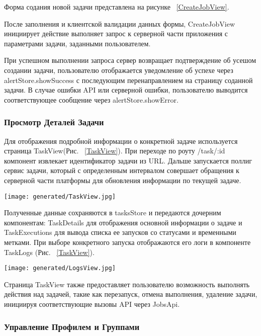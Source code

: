 Форма содания новой задачи представлена на рисунке ~\ref{CreateJobView}.

После заполнения и клиентской валидации данных формы, CreateJobView инициирует действие выполняет запрос к серверной части приложения с параметрами задачи, заданными пользователем.

При успешном выполнении запроса сервер возвращает подтверждение об усешом создании задачи, пользователю отображается уведомление об успехе через alertStore.showSuccess с последующим перенаправлением на страницу соданной задачи. В случае ошибки API или серверной ошибки, пользователю выводится соответствующее сообщение через alertStore.showError.

\subsubsection{Просмотр Деталей Задачи}

Для отображения подробной информации о конкретной задаче используется страница TaskView(Рис. ~\ref{TaskView}). При переходе по роуту /task/:id компонент извлекает идентификатор задачи из URL. Дальше запускается поллиг сервис задачи, который с определенным интервалом совершает обращения к серверной части платформы для обновления информации по текущей задаче.

\begin{figure*}[!t]
  \centering
  \texttt{[image: generated/TaskView.jpg]}
  \caption{Экран задачи}
  \label{TaskView}
\end{figure*}

Полученные данные сохраняются в tasksStore и передаются дочерним компонентам: TaskDetails для отображения основной информации о задаче и TaskExecutions для вывода списка ее запусков со статусами и временными метками. При выборе конкретного запуска отображаются его логи в компоненте TaskLogs (Рис. ~\ref{TaskView}).

\begin{figure*}[!t]
  \centering
  \texttt{[image: generated/LogsView.jpg]}
  \caption{Модальное окно просмотра логов}
  \label{LogsView}
\end{figure*}

Страница TaskView также предоставляет пользователю возможность выполнять действия над задачей, такие как перезапуск, отмена выполнения, удаление задачи, инициируя соответствующие вызовы API через JobsApi.

\subsubsection{Управление Профилем и Группами}

